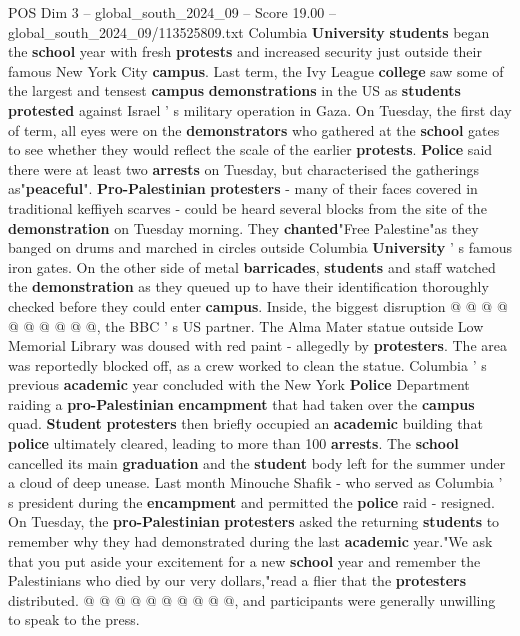 \begin{textsample}{POS Dim 3 – global\_south\_2024\_09 – Score 19.00 – global\_south\_2024\_09/113525809.txt}  \label{ex:f3_pos_328}
Columbia \textbf{University} \textbf{students} began the \textbf{school} year with fresh \textbf{protests} and increased security just outside their famous New York City \textbf{campus}.
Last term, the Ivy League \textbf{college} saw some of the largest and tensest \textbf{campus} \textbf{demonstrations} in the US as \textbf{students} \textbf{protested} against Israel ' s military operation in Gaza.
On Tuesday, the first day of term, all eyes were on the \textbf{demonstrators} who gathered at the \textbf{school} gates to see whether they would reflect the scale of the earlier \textbf{protests}. \textbf{Police} said there were at least two \textbf{arrests} on Tuesday, but characterised the gatherings as"\textbf{peaceful}". \textbf{Pro-Palestinian} \textbf{protesters} - many of their faces covered in traditional keffiyeh scarves - could be heard several blocks from the site of the \textbf{demonstration} on Tuesday morning.
They \textbf{chanted}"Free Palestine"as they banged on drums and marched in circles outside Columbia \textbf{University} ' s famous iron gates.
On the other side of metal \textbf{barricades}, \textbf{students} and staff watched the \textbf{demonstration} as they queued up to have their identification thoroughly checked before they could enter \textbf{campus}.
Inside, the biggest disruption @ @ @ @ @ @ @ @ @ @, the BBC ' s US partner.
The Alma Mater statue outside Low Memorial Library was doused with red paint - allegedly by \textbf{protesters}.
The area was reportedly blocked off, as a crew worked to clean the statue.
Columbia ' s previous \textbf{academic} year concluded with the New York \textbf{Police} Department raiding a \textbf{pro-Palestinian} \textbf{encampment} that had taken over the \textbf{campus} quad. \textbf{Student} \textbf{protesters} then briefly occupied an \textbf{academic} building that \textbf{police} ultimately cleared, leading to more than 100 \textbf{arrests}.
The \textbf{school} cancelled its main \textbf{graduation} and the \textbf{student} body left for the summer under a cloud of deep unease.
Last month Minouche Shafik - who served as Columbia ' s president during the \textbf{encampment} and permitted the \textbf{police} raid - resigned.
On Tuesday, the \textbf{pro-Palestinian} \textbf{protesters} asked the returning \textbf{students} to remember why they had demonstrated during the last \textbf{academic} year."We ask that you put aside your excitement for a new \textbf{school} year and remember the Palestinians who died by our very dollars,"read a flier that the \textbf{protesters} distributed. @ @ @ @ @ @ @ @ @ @, and participants were generally unwilling to speak to the press.

\end{textsample}
